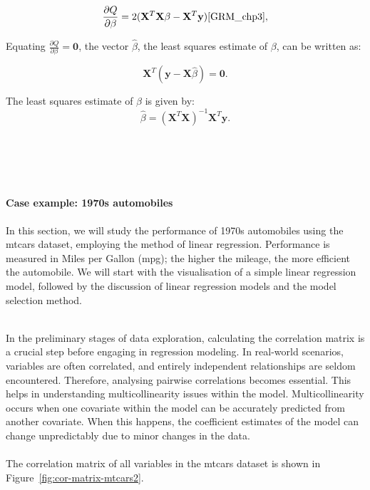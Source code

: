 \documentclass{article}\usepackage[]{graphicx}\usepackage[]{xcolor}
\begin{document}
$$\frac{\partial Q}{\partial \beta} = 2(\mathbf{X}^T\mathbf{X}\beta - \mathbf{X}^T\mathbf{y})\cite{GRM_chp3},$$

\noindent
Equating $\frac{\partial Q}{\partial \beta} = \mathbf{0}$, the vector $\hat{\beta}$, the least squares estimate of $\beta$, can be written as:

$$\mathbf{X}^T(\mathbf{y}-\mathbf{X}\hat{\beta})=\mathbf{0}.$$

\noindent 
The least squares estimate of $\beta$ is given by:
$$\hat{\beta} = (\mathbf{X}^T\mathbf{X})^{-1}\mathbf{X}^T\mathbf{y}.$$
\\ 
\\
\\
\\
\noident 
\\\textbf{Case example: 1970s automobiles}\\
\noindent
\\In this section, we will study the performance of 1970s automobiles using the mtcars dataset, employing the method of linear regression. Performance is measured in Miles per Gallon (mpg); the higher the mileage, the more efficient the automobile. We will start with the visualisation of a simple linear regression model, followed by the discussion of linear regression models and the model selection method.

\noindent
\\In the preliminary stages of data exploration, calculating the correlation matrix is a crucial step before engaging in regression modeling. In real-world scenarios, variables are often correlated, and entirely independent relationships are seldom encountered. Therefore, analysing pairwise correlations becomes essential. This helps in understanding multicollinearity issues within the model. Multicollinearity occurs when one covariate within the model can be accurately predicted from another covariate. When this happens, the coefficient estimates of the model can change unpredictably due to minor changes in the data.\\
\noindent
\\The correlation matrix of all variables in the mtcars dataset is shown in Figure~\ref{fig:cor-matrix-mtcars2}.
\end{document}

